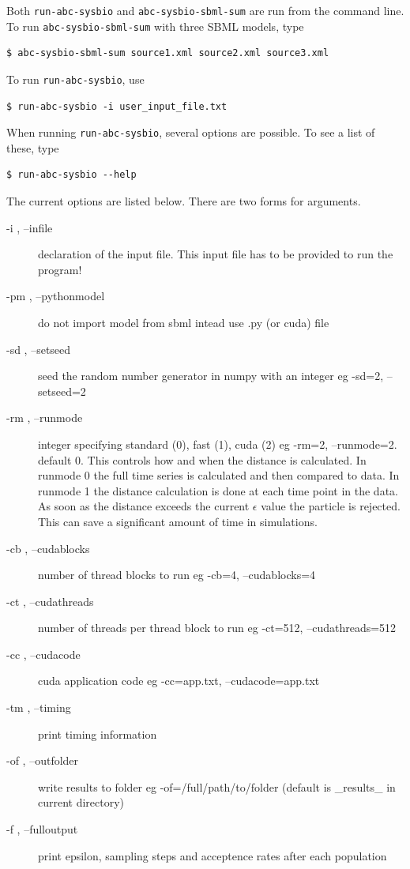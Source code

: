 \documentclass[a4paper]{report}
\begin{document}
Both \verb$run-abc-sysbio$ and \verb$abc-sysbio-sbml-sum$ are run from the command line. To run \verb$abc-sysbio-sbml-sum$ with three SBML models, type
\begin{verbatim}
$ abc-sysbio-sbml-sum source1.xml source2.xml source3.xml
\end{verbatim}
To run \verb$run-abc-sysbio$, use
\begin{verbatim}
$ run-abc-sysbio -i user_input_file.txt
\end{verbatim}
When running \verb$run-abc-sysbio$, several options are possible. To see a list of these, type
\begin{verbatim}
$ run-abc-sysbio --help
\end{verbatim}
The current options are listed below. There are two forms for arguments.
\begin{description}
\item [ -i  ,    --infile] declaration of the input file. This input file has to be provided to run the program!
\item[-pm ,    --pythonmodel]    do not import model from sbml intead use .py (or cuda) file
\item[-sd   ,  --setseed]        seed the random number generator in numpy with an integer eg -sd=2, --setseed=2
\item[-rm   ,  --runmode]        integer specifying standard (0), fast (1), cuda (2) eg -rm=2, --runmode=2. default 0. This controls how and when the distance is calculated. In runmode 0 the full time series is calculated and then compared to data. In runmode 1 the distance calculation is done at each time point in the data. As soon as the distance exceeds the current $\epsilon$ value the particle is rejected. This can save a significant amount of time in simulations. 
\item[-cb  ,   --cudablocks]     number of thread blocks to run eg -cb=4, --cudablocks=4
\item[-ct  ,   --cudathreads]    number of threads per thread block to run eg -ct=512, --cudathreads=512
\item[-cc  ,   --cudacode]       cuda application code eg -cc=app.txt, --cudacode=app.txt
\item[-tm  ,   --timing]         print timing information
\item[-of  ,   --outfolder]      write results to folder eg -of=/full/path/to/folder (default is \_results\_ in current directory)
\item[-f   ,   --fulloutput]     print epsilon, sampling steps and acceptence rates after each population

\end{description}
\end{document}
